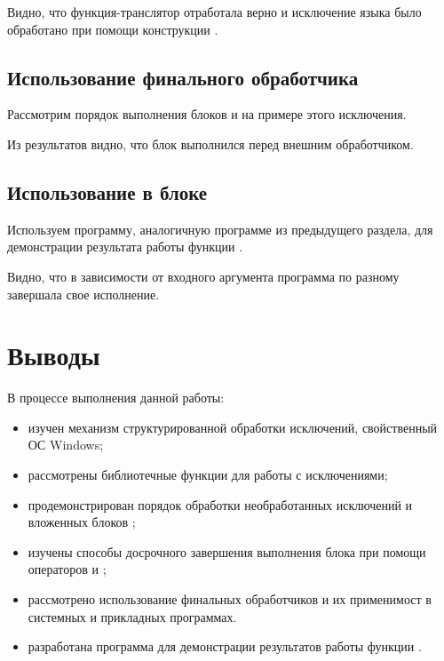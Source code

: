 Видно, что функция-транслятор отработала верно и исключение языка  было обработано при помощи конструкции .

\subsection{Использование финального обработчика }

Рассмотрим порядок выполнения блоков  и  на примере этого исключения.


Из результатов видно, что блок  выполнился перед внешним обработчиком.

\subsection{Использование  в блоке }

Используем программу, аналогичную программе из предыдущего раздела, для демонстрации результата работы функции .


Видно, что в зависимости от входного аргумента программа по разному завершала свое исполнение.

\section{Выводы}

В процессе выполнения данной работы:

\begin{itemize}
	\item изучен механизм структурированной обработки исключений, свойственный ОС Windows;
	\item рассмотрены библиотечные функции для работы с исключениями;
	\item продемонстрирован порядок обработки необработанных исключений и вложенных блоков ;
	\item изучены способы досрочного завершения выполнения блока  при помощи операторов  и ;
	\item рассмотрено использование финальных обработчиков  и их применимост в системных и прикладных программах.
	\item разработана программа для демонстрации результатов работы функции .
\end{itemize}

